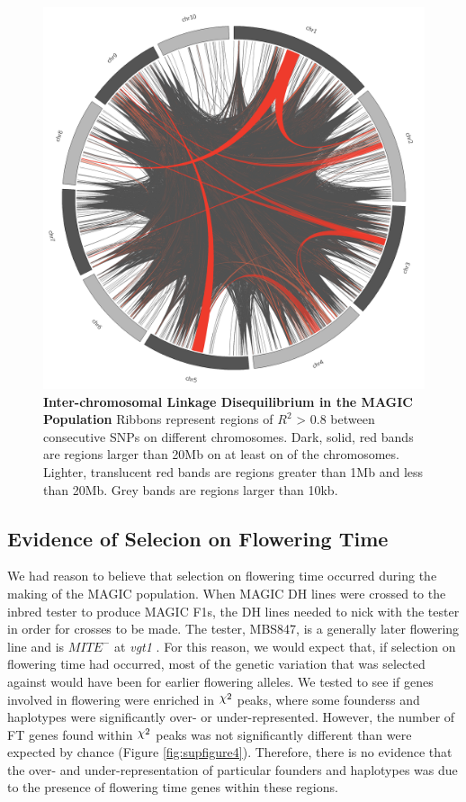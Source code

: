 \documentclass[article,9pt,twocolumn,twoside]{rilabRxiv}
\DeclareRobustCommand{\rchi}{{\mathpalette\irchi\relax}}
\newcommand{\irchi}[2]{\raisebox{\depth}{$#1\chi$}} %
\begin{document}
\begin{figure}[ht]
\centering
\includegraphics[width=\linewidth]{figures/circos.png}
\caption{\textbf{Inter-chromosomal Linkage Disequilibrium in the MAGIC Population} Ribbons represent regions of $R^2$ > 0.8 between consecutive SNPs on different chromosomes. Dark, solid, red bands are regions larger than 20Mb on at least on of the chromosomes. Lighter, translucent red bands are regions greater than 1Mb and less than 20Mb. Grey bands are regions larger than 10kb.}
\label{fig:circosfigure}
\end{figure}

\subsection{Evidence of Selecion on Flowering Time}
We had reason to believe that selection on flowering time occurred during the making of the MAGIC population.
When MAGIC DH lines were crossed to the inbred tester to produce MAGIC F1s, the DH lines needed to nick with the tester in order for crosses to be made.
The tester, MBS847, is a generally later flowering line and is $MITE^-$ at \emph{vgt1} \cite{Chardon}.
For this reason, we would expect that, if selection on flowering time had occurred, most of the genetic variation that was selected against would have been for earlier flowering alleles.
We tested to see if genes involved in flowering were enriched in $\rchi^2$ peaks, where some founderss and haplotypes were significantly over- or under-represented.
However, the number of FT genes found within $\rchi^2$ peaks was not significantly different than were expected by chance (Figure \ref{fig:supfigure4}).
Therefore, there is no evidence that the over- and under-representation of particular founders and haplotypes was due to the presence of flowering time genes within these regions.
\end{document}
